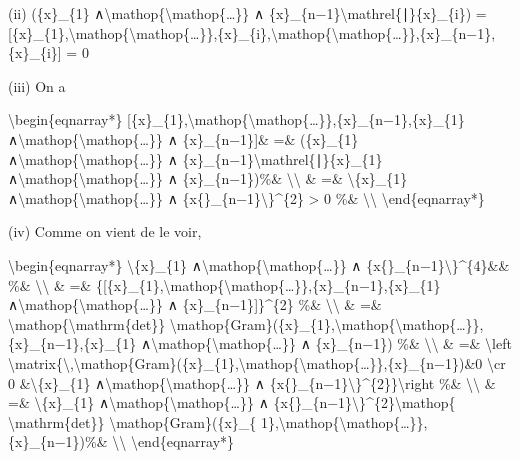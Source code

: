 \documentclass[]{article}
\begin{document}
(ii) (\{x\}\_\{1\}
∧\textbackslash{}mathop\{\textbackslash{}mathop\{\ldots{}\}\} ∧
\{x\}\_\{n−1\}\textbackslash{}mathrel\{∣\}\{x\}\_\{i\}) =
{[}\{x\}\_\{1\},\textbackslash{}mathop\{\textbackslash{}mathop\{\ldots{}\}\},\{x\}\_\{i\},\textbackslash{}mathop\{\textbackslash{}mathop\{\ldots{}\}\},\{x\}\_\{n−1\},\{x\}\_\{i\}{]}
= 0

(iii) On a

\textbackslash{}begin\{eqnarray*\}
{[}\{x\}\_\{1\},\textbackslash{}mathop\{\textbackslash{}mathop\{\ldots{}\}\},\{x\}\_\{n−1\},\{x\}\_\{1\}
∧\textbackslash{}mathop\{\textbackslash{}mathop\{\ldots{}\}\} ∧
\{x\}\_\{n−1\}{]}\& =\& (\{x\}\_\{1\}
∧\textbackslash{}mathop\{\textbackslash{}mathop\{\ldots{}\}\} ∧
\{x\}\_\{n−1\}\textbackslash{}mathrel\{∣\}\{x\}\_\{1\}
∧\textbackslash{}mathop\{\textbackslash{}mathop\{\ldots{}\}\} ∧
\{x\}\_\{n−1\})\%\& \textbackslash{}\textbackslash{} \& =\&
\textbackslash{}\textbar{}\{x\}\_\{1\}
∧\textbackslash{}mathop\{\textbackslash{}mathop\{\ldots{}\}\} ∧
\{x\{\}\_\{n−1\}\textbackslash{}\textbar{}\}\^{}\{2\} \textgreater{} 0
\%\& \textbackslash{}\textbackslash{} \textbackslash{}end\{eqnarray*\}

(iv) Comme on vient de le voir,

\textbackslash{}begin\{eqnarray*\}
\textbackslash{}\textbar{}\{x\}\_\{1\}
∧\textbackslash{}mathop\{\textbackslash{}mathop\{\ldots{}\}\} ∧
\{x\{\}\_\{n−1\}\textbackslash{}\textbar{}\}\^{}\{4\}\&\& \%\&
\textbackslash{}\textbackslash{} \& =\&
\{{[}\{x\}\_\{1\},\textbackslash{}mathop\{\textbackslash{}mathop\{\ldots{}\}\},\{x\}\_\{n−1\},\{x\}\_\{1\}
∧\textbackslash{}mathop\{\textbackslash{}mathop\{\ldots{}\}\} ∧
\{x\}\_\{n−1\}{]}\}\^{}\{2\} \%\& \textbackslash{}\textbackslash{} \&
=\& \textbackslash{}mathop\{\textbackslash{}mathrm\{det\}\}
\textbackslash{}mathop\{Gram\}(\{x\}\_\{1\},\textbackslash{}mathop\{\textbackslash{}mathop\{\ldots{}\}\},\{x\}\_\{n−1\},\{x\}\_\{1\}
∧\textbackslash{}mathop\{\textbackslash{}mathop\{\ldots{}\}\} ∧
\{x\}\_\{n−1\}) \%\& \textbackslash{}\textbackslash{} \& =\&
\textbackslash{}left
\textbar{}\textbackslash{}matrix\{\textbackslash{},\textbackslash{}mathop\{Gram\}(\{x\}\_\{1\},\textbackslash{}mathop\{\textbackslash{}mathop\{\ldots{}\}\},\{x\}\_\{n−1\})\&0
\textbackslash{}cr 0 \&\textbackslash{}\textbar{}\{x\}\_\{1\}
∧\textbackslash{}mathop\{\textbackslash{}mathop\{\ldots{}\}\} ∧
\{x\{\}\_\{n−1\}\textbackslash{}\textbar{}\}\^{}\{2\}\}\textbackslash{}right
\textbar{} \%\& \textbackslash{}\textbackslash{} \& =\&
\textbackslash{}\textbar{}\{x\}\_\{1\}
∧\textbackslash{}mathop\{\textbackslash{}mathop\{\ldots{}\}\} ∧
\{x\{\}\_\{n−1\}\textbackslash{}\textbar{}\}\^{}\{2\}\textbackslash{}mathop\{
\textbackslash{}mathrm\{det\}\} \textbackslash{}mathop\{Gram\}(\{x\}\_\{
1\},\textbackslash{}mathop\{\textbackslash{}mathop\{\ldots{}\}\},\{x\}\_\{n−1\})\%\&
\textbackslash{}\textbackslash{} \textbackslash{}end\{eqnarray*\}
\end{document}

